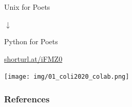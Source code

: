 \documentclass{beamer}
\begin{document}
\begin{frame}
\centering
\alert{Unix for Poets}
\medskip

$\downarrow$
\medskip

\alert{Python for Poets}

\pause

\bigskip
\centering
\url{shorturl.at/iFMZ0}

\texttt{[image: img/01\_coli2020\_colab.png]}

\end{frame}




\begin{frame}
\frametitle{References}


\end{frame}
\end{document}
